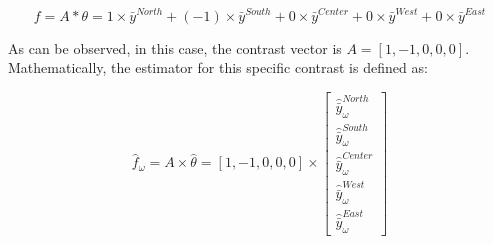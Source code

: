 \documentclass[
  12pt,
]{book}
\begin{document}
\[
f = A * \theta = 1 \times \bar{y}^{North} + (-1) \times \bar{y}^{South} + 0 \times \bar{y}^{Center} + 0 \times \bar{y}^{West} + 0 \times \bar{y}^{East}
\]

As can be observed, in this case, the contrast vector is \(A = \left[1, -1, 0, 0, 0\right]\). Mathematically, the estimator for this specific contrast is defined as:

\[
\hat{f}_{\omega} = A \times \hat{\theta} = \left[1, -1, 0, 0, 0\right] \times \left[
\begin{array}{c}
\hat{\bar{y}}^{North}_{\omega} \\
\hat{\bar{y}}^{South}_{\omega} \\
\hat{\bar{y}}^{Center}_{\omega} \\
\hat{\bar{y}}^{West}_{\omega} \\
\hat{\bar{y}}^{East}_{\omega}
\end{array}
\right]
\]
\end{document}
